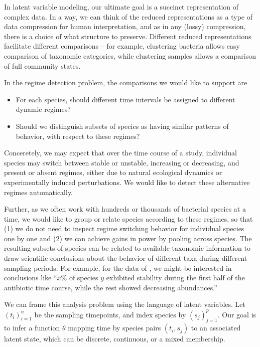 \documentclass[14pt]{extreport}
\begin{document}
In latent variable modeling, our ultimate goal is a succinct representation of
complex data. In a way, we can think of the reduced representations as a type of
data compression for human interpretation, and as in any (lossy) compression,
there is a choice of what structure to preserve. Different reduced
representations facilitate different comparisons -- for example, clustering
bacteria allows easy comparison of taxonomic categories, while clustering
samples allows a comparison of full community states.

In the regime detection problem, the comparisons we would like to support are
\begin{itemize}
\item For each species, should different time intervals be assigned to different
  dynamic regimes?
\item Should we distinguish subsets of species as having similar patterns of
  behavior, with respect to these regimes?
\end{itemize}

Conceretely, we may expect that over the time course of a study, individual
species may switch between stable or unstable, increasing or decreasing, and
present or absent regimes, either due to natural ecological dynamics or
experimentally induced perturbations. We would like to detect these alternative
regimes automatically.

Further, as we often work with hundreds or thousands of bacterial species at a
time, we would like to group or relate species according to these regimes, so
that (1) we do not need to inspect regime switching behavior for individual
species one by one and (2) we can achieve gains in power by pooling across
species. The resulting subsets of species can be related to available taxonomic
information to draw scientific conclusions about the behavior of different taxa
during different sampling periods. For example, for the data of
\cite{dethlefsen2011incomplete}, we might be interested in conclusions like
``$x$\% of species $y$ exhibited stability during the first half of the
antibiotic time course, while the rest showed decreasing abundances.''

We can frame this analysis problem using the language of latent variables. Let
$\left(t_{i}\right)_{i = 1}^{n}$ be the sampling timepoints, and index species
by $\left(s_{j}\right)_{j = 1}^{p}$. Our goal is to infer a function $\theta$
mapping time by species pairs $\left(t_{i}, s_{j}\right)$ to an associated
latent state, which can be discrete, continuous, or a mixed membership.
\end{document}
